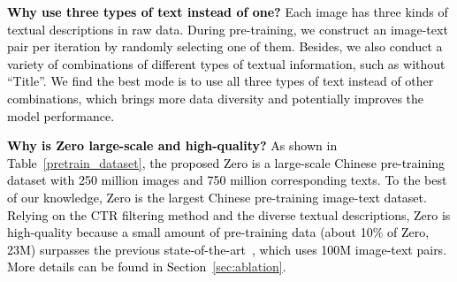 \documentclass[sigconf]{acmart}
\def\blue{\textcolor{black}}
\def\mmljc{\textcolor{black}}
\def\pretraindata{Zero}
\begin{document}
\mmljc{\textbf{Why use three types of text instead of one?}}
\mmljc{Each image has three kinds of textual descriptions in raw data. During pre-training, we construct an image-text pair per iteration by randomly selecting one of them. Besides, we also conduct a variety of combinations of different types of textual information, such as without ``Title''. We find the best mode is to use all three types of text instead of other combinations, which brings more data diversity and potentially improves the model performance.}







\mmljc{
\textbf{Why is \pretraindata{} large-scale and high-quality?} As shown in Table~\ref{pretrain_dataset}, the proposed \pretraindata{} is a large-scale Chinese pre-training dataset with 250 million images and 750 million corresponding texts. To the best of our knowledge, \pretraindata{} is the largest Chinese pre-training image-text dataset. Relying on the CTR filtering method and the diverse textual descriptions, \pretraindata{} is high-quality because a small amount of pre-training data (about 10\% of \pretraindata{}, 23M) surpasses the previous state-of-the-art~\cite{gu2022wukong}, which uses 100M image-text pairs. More details can be found in Section~\ref{sec:ablation}.
}









\begin{table}[t]
\centering \caption{\blue{Statistics of the vision-language downstream datasets. Our downstream datasets can refer to Section~\ref{downstream_dataset_intro}.}}
\label{downnstream_dataset}
\end{table}
\end{document}
